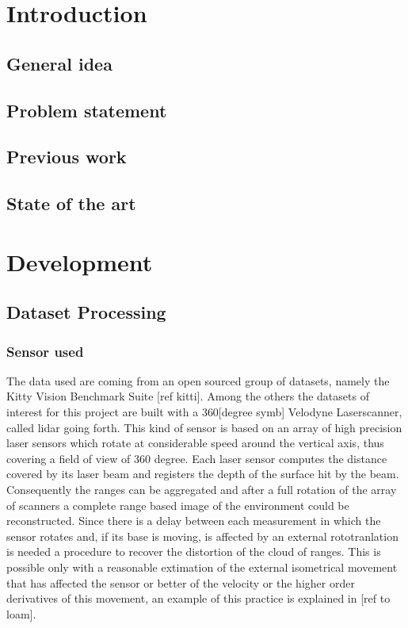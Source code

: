 
\chapter{Introduction}
\section{General idea}
\section{Problem statement}
\section{Previous work}
\section{State of the art}

\chapter{Development}

\section{Dataset Processing }


\subsection{Sensor used}
The data used are coming from an open sourced group of datasets, namely the Kitty Vision Benchmark Suite [ref kitti]. Among the others the datasets of interest for this project are built with a 360[degree symb] Velodyne Laserscanner, called lidar going forth. This kind of sensor is based on an array of high precision laser sensors which rotate at considerable speed around the vertical axis, thus covering a field of view of 360 degree. Each laser sensor computes the distance covered by its laser beam and registers the depth of the surface hit by the beam.
Consequently the ranges can be aggregated and after a full rotation of the array of scanners a complete range based image of the environment could be reconstructed. Since there is a delay between each measurement in which the sensor rotates and, if its base is moving, is affected by an external rototranlation is needed a procedure to recover the distortion of the cloud of ranges. This is possible only with a reasonable extimation of the external isometrical movement that has affected the sensor or better of the velocity or the higher order derivatives of this movement, an example of this practice is explained in [ref to loam].

